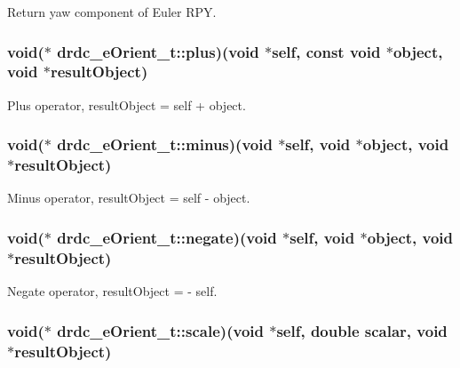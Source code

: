 Return yaw component of Euler RPY. 

\hypertarget{structdrdc__eOrient__t_7f398844060c7b582fdd8b576f94443a}{
\subsubsection[plus]{\setlength{\rightskip}{0pt plus 5cm}void($\ast$ {\bf drdc\_\-eOrient\_\-t::plus})(void $\ast$self, const void $\ast$object, void $\ast$resultObject)}}
\label{structdrdc__eOrient__t_7f398844060c7b582fdd8b576f94443a}


Plus operator, resultObject = self + object. 

\hypertarget{structdrdc__eOrient__t_ef5188ecc6215dd22826b32ae94c8c3e}{
\subsubsection[minus]{\setlength{\rightskip}{0pt plus 5cm}void($\ast$ {\bf drdc\_\-eOrient\_\-t::minus})(void $\ast$self, void $\ast$object, void $\ast$resultObject)}}
\label{structdrdc__eOrient__t_ef5188ecc6215dd22826b32ae94c8c3e}


Minus operator, resultObject = self - object. 

\hypertarget{structdrdc__eOrient__t_95d500ab896201c8f4c3822a1432f556}{
\subsubsection[negate]{\setlength{\rightskip}{0pt plus 5cm}void($\ast$ {\bf drdc\_\-eOrient\_\-t::negate})(void $\ast$self, void $\ast$object, void $\ast$resultObject)}}
\label{structdrdc__eOrient__t_95d500ab896201c8f4c3822a1432f556}


Negate operator, resultObject = - self. 

\hypertarget{structdrdc__eOrient__t_23756f8de6f265fd46a43971740c3a1e}{
\subsubsection[scale]{\setlength{\rightskip}{0pt plus 5cm}void($\ast$ {\bf drdc\_\-eOrient\_\-t::scale})(void $\ast$self, double scalar, void $\ast$resultObject)}}
\label{structdrdc__eOrient__t_23756f8de6f265fd46a43971740c3a1e}


